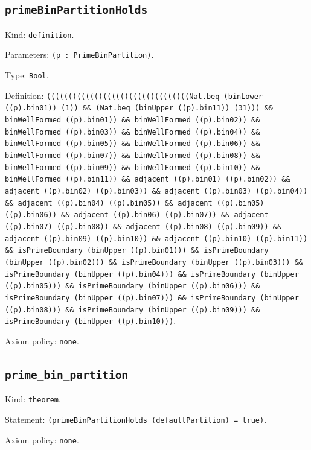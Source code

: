 \documentclass[11pt]{article}
\begin{document}
\subsection*{\texttt{primeBinPartitionHolds}}
\noindent Kind: \texttt{definition}.\par
\noindent Parameters: \texttt{(p : PrimeBinPartition)}.\par
\noindent Type: \texttt{Bool}.\par
\noindent Definition: \texttt{(((((((((((((((((((((((((((((((((Nat.beq (binLower ((p).bin01)) (1)) \&\& (Nat.beq (binUpper ((p).bin11)) (31))) \&\& binWellFormed ((p).bin01)) \&\& binWellFormed ((p).bin02)) \&\& binWellFormed ((p).bin03)) \&\& binWellFormed ((p).bin04)) \&\& binWellFormed ((p).bin05)) \&\& binWellFormed ((p).bin06)) \&\& binWellFormed ((p).bin07)) \&\& binWellFormed ((p).bin08)) \&\& binWellFormed ((p).bin09)) \&\& binWellFormed ((p).bin10)) \&\& binWellFormed ((p).bin11)) \&\& adjacent ((p).bin01) ((p).bin02)) \&\& adjacent ((p).bin02) ((p).bin03)) \&\& adjacent ((p).bin03) ((p).bin04)) \&\& adjacent ((p).bin04) ((p).bin05)) \&\& adjacent ((p).bin05) ((p).bin06)) \&\& adjacent ((p).bin06) ((p).bin07)) \&\& adjacent ((p).bin07) ((p).bin08)) \&\& adjacent ((p).bin08) ((p).bin09)) \&\& adjacent ((p).bin09) ((p).bin10)) \&\& adjacent ((p).bin10) ((p).bin11)) \&\& isPrimeBoundary (binUpper ((p).bin01))) \&\& isPrimeBoundary (binUpper ((p).bin02))) \&\& isPrimeBoundary (binUpper ((p).bin03))) \&\& isPrimeBoundary (binUpper ((p).bin04))) \&\& isPrimeBoundary (binUpper ((p).bin05))) \&\& isPrimeBoundary (binUpper ((p).bin06))) \&\& isPrimeBoundary (binUpper ((p).bin07))) \&\& isPrimeBoundary (binUpper ((p).bin08))) \&\& isPrimeBoundary (binUpper ((p).bin09))) \&\& isPrimeBoundary (binUpper ((p).bin10)))}.\par
\noindent Axiom policy: \texttt{none}.\par
\subsection*{\texttt{prime\_bin\_partition}}
\noindent Kind: \texttt{theorem}.\par
\noindent Statement: \texttt{(primeBinPartitionHolds (defaultPartition) = true)}.\par
\noindent Axiom policy: \texttt{none}.\par
\end{document}
